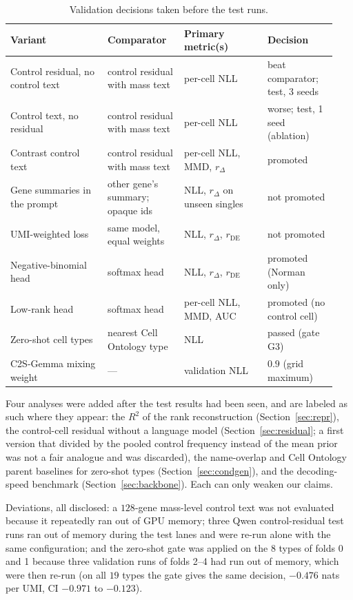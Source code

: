 \documentclass[10pt]{article}
\begin{document}
\begin{table}[!htb]
\centering
\scriptsize
\setlength{\tabcolsep}{3pt}
\begin{tabular}{>{\raggedright\arraybackslash}p{0.28\linewidth}>{\raggedright\arraybackslash}p{0.22\linewidth}>{\raggedright\arraybackslash}p{0.24\linewidth}>{\raggedright\arraybackslash}p{0.20\linewidth}}
\toprule
Variant & Comparator & Primary metric(s) & Decision \\
\midrule
Control residual, no control text & control residual with mass text & per-cell NLL & beat comparator; test, 3 seeds \\
Control text, no residual & control residual with mass text & per-cell NLL & worse; test, 1 seed (ablation) \\
Contrast control text & control residual with mass text & per-cell NLL, MMD, $r_\Delta$ & promoted \\
Gene summaries in the prompt & other gene's summary; opaque ids & NLL, $r_\Delta$ on unseen singles & not promoted \\
UMI-weighted loss & same model, equal weights & NLL, $r_\Delta$, $r_{\mathrm{DE}}$ & not promoted \\
Negative-binomial head & softmax head & NLL, $r_\Delta$, $r_{\mathrm{DE}}$ & promoted (Norman only) \\
Low-rank head & softmax head & per-cell NLL, MMD, AUC & promoted (no control cell) \\
Zero-shot cell types & nearest Cell Ontology type & NLL & passed (gate G3) \\
C2S-Gemma mixing weight & --- & validation NLL & $0.9$ (grid maximum) \\
\bottomrule
\end{tabular}
\caption{Validation decisions taken before the test runs.}
\label{tab:decisions}
\end{table}

Four analyses were added after the test results had been seen, and are labeled as such where they appear: the $R^2$ of the rank reconstruction (Section~\ref{sec:repr}), the control-cell residual without a language model (Section~\ref{sec:residual}; a first version that divided by the pooled control frequency instead of the mean prior was not a fair analogue and was discarded), the name-overlap and Cell Ontology parent baselines for zero-shot types (Section~\ref{sec:condgen}), and the decoding-speed benchmark (Section~\ref{sec:backbone}). Each can only weaken our claims.

Deviations, all disclosed: a $128$-gene mass-level control text was not evaluated because it repeatedly ran out of GPU memory; three Qwen control-residual test runs ran out of memory during the test lanes and were re-run alone with the same configuration; and the zero-shot gate was applied on the $8$ types of folds 0 and 1 because three validation runs of folds 2--4 had run out of memory, which were then re-run (on all $19$ types the gate gives the same decision, $-0.476$ nats per UMI, CI $-0.971$ to $-0.123$).
\end{document}
